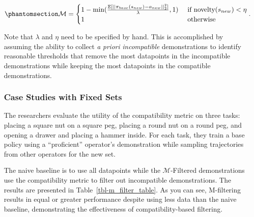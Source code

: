 \documentclass[
  letterpaper,
  numbers=noenddot,
  DIV=11]{scrreprt}
\theoremstyle{plain}
\theoremstyle{definition}
\theoremstyle{plain}
\theoremstyle{remark}
\begin{document}
\begin{equation}\phantomsection\label{eq-eq3.63}{\begin{aligned}
    \mathcal{M} = \begin{cases} 
        1 - \min(\frac{\mathbb{E}[|| \pi_{base}(s_{new}) - a_{new} ||^2_2]}{\lambda}, 1) & \text{ if } \text{novelty}(s_{new}) < \eta \\
        1 & \text{ otherwise }
       \end{cases}.
\end{aligned}}\end{equation}

Note that \(\lambda\) and \(\eta\) need to be specified by hand. This is
accomplished by assuming the ability to collect \emph{a priori
incompatible} demonstrations to identify reasonable thresholds that
remove the most datapoints in the incompatible demonstrations while
keeping the most datapoints in the compatible demonstrations.

\subsubsection*{Case Studies with Fixed
Sets}\label{case-studies-with-fixed-sets}

The researchers evaluate the utility of the compatibility metric on
three tasks: placing a square nut on a square peg, placing a round nut
on a round peg, and opening a drawer and placing a hammer inside. For
each task, they train a base policy using a ``proficient'' operator's
demonstration while sampling trajectories from other operators for the
new set.

The naive baseline is to use all datapoints while the
\(\mathcal{M}\)-Filtered demonstrations use the compatibility metric to
filter out incompatible demonstrations. The results are presented in
Table~\ref{tbl-m_filter_table}. As you can see, M-filtering results in
equal or greater performance despite using less data than the naive
baseline, demonstrating the effectiveness of compatibility-based
filtering.
\end{document}
